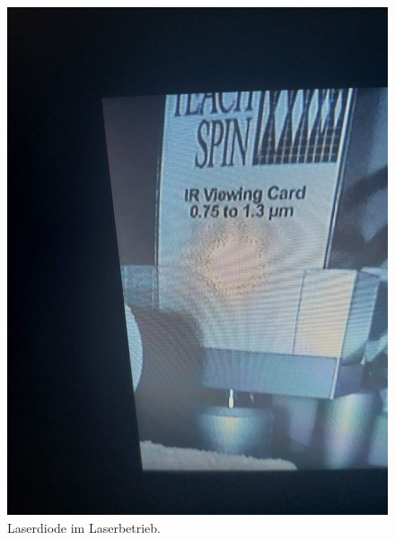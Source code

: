 \begin{figure}[h!]
  \centering
  \includegraphics[scale=0.1]{fig/laser.jpeg}
  \caption{Laserdiode im Laserbetrieb.}
  \label{fig:mess2}
\end{figure}
\FloatBarrier
